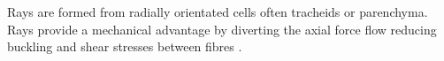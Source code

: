 Rays are formed from radially orientated cells often tracheids or parenchyma. Rays provide a mechanical advantage by diverting the axial force flow
reducing buckling and shear stresses between fibres \cite{mattheck1997wood}.